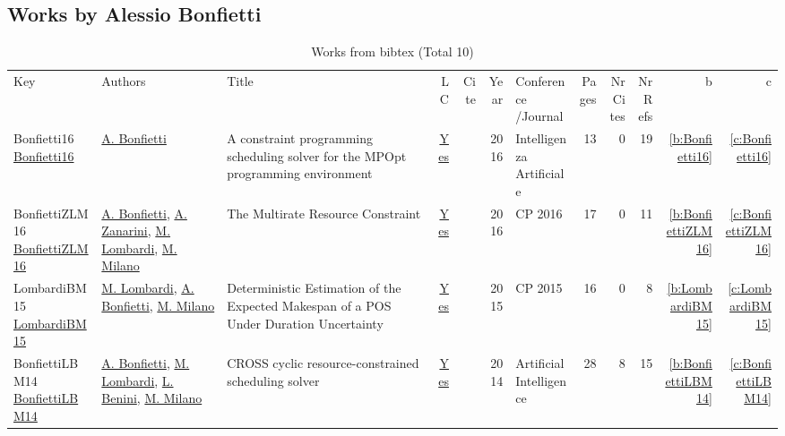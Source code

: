 \subsection{Works by Alessio Bonfietti}
\label{sec:a204}
{\scriptsize
\begin{longtable}{>{\raggedright\arraybackslash}p{3cm}>{\raggedright\arraybackslash}p{6cm}>{\raggedright\arraybackslash}p{6.5cm}rrrp{2.5cm}rrrrr}
\rowcolor{white}\caption{Works from bibtex (Total 10)}\\ \toprule
\rowcolor{white}Key & Authors & Title & LC & Cite & Year & \shortstack{Conference\\/Journal} & Pages & \shortstack{Nr\\Cites} & \shortstack{Nr\\Refs} & b & c \\ \midrule\endhead
\bottomrule
\endfoot
Bonfietti16 \href{https://doi.org/10.3233/IA-160095}{Bonfietti16} & \hyperref[auth:a204]{A. Bonfietti} & A constraint programming scheduling solver for the MPOpt programming environment & \href{works/Bonfietti16.pdf}{Yes} & \cite{Bonfietti16} & 2016 & Intelligenza Artificiale & 13 & 0 & 19 & \ref{b:Bonfietti16} & \ref{c:Bonfietti16}\\
BonfiettiZLM16 \href{https://doi.org/10.1007/978-3-319-44953-1\_8}{BonfiettiZLM16} & \hyperref[auth:a204]{A. Bonfietti}, \hyperref[auth:a205]{A. Zanarini}, \hyperref[auth:a143]{M. Lombardi}, \hyperref[auth:a144]{M. Milano} & The Multirate Resource Constraint & \href{works/BonfiettiZLM16.pdf}{Yes} & \cite{BonfiettiZLM16} & 2016 & CP 2016 & 17 & 0 & 11 & \ref{b:BonfiettiZLM16} & \ref{c:BonfiettiZLM16}\\
LombardiBM15 \href{https://doi.org/10.1007/978-3-319-23219-5\_20}{LombardiBM15} & \hyperref[auth:a143]{M. Lombardi}, \hyperref[auth:a204]{A. Bonfietti}, \hyperref[auth:a144]{M. Milano} & Deterministic Estimation of the Expected Makespan of a {POS} Under Duration Uncertainty & \href{works/LombardiBM15.pdf}{Yes} & \cite{LombardiBM15} & 2015 & CP 2015 & 16 & 0 & 8 & \ref{b:LombardiBM15} & \ref{c:LombardiBM15}\\
BonfiettiLBM14 \href{https://doi.org/10.1016/j.artint.2013.09.006}{BonfiettiLBM14} & \hyperref[auth:a204]{A. Bonfietti}, \hyperref[auth:a143]{M. Lombardi}, \hyperref[auth:a248]{L. Benini}, \hyperref[auth:a144]{M. Milano} & {CROSS} cyclic resource-constrained scheduling solver & \href{works/BonfiettiLBM14.pdf}{Yes} & \cite{BonfiettiLBM14} & 2014 & Artificial Intelligence & 28 & 8 & 15 & \ref{b:BonfiettiLBM14} & \ref{c:BonfiettiLBM14}\\

\end{longtable}}
